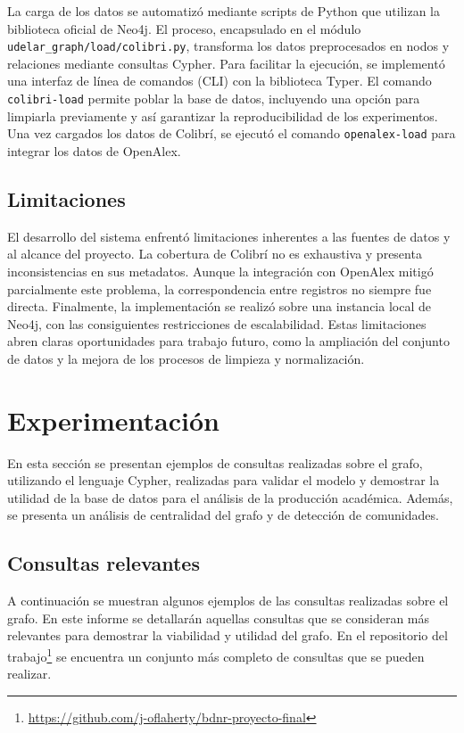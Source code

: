 \documentclass[journal]{IEEEtran}
\begin{document}
La carga de los datos se automatizó mediante scripts de Python que utilizan la biblioteca oficial de Neo4j. El proceso, encapsulado en el módulo \texttt{udelar\_graph/load/colibri.py}, transforma los datos preprocesados en nodos y relaciones mediante consultas Cypher. Para facilitar la ejecución, se implementó una interfaz de línea de comandos (CLI) con la biblioteca Typer. El comando \texttt{colibri-load} permite poblar la base de datos, incluyendo una opción para limpiarla previamente y así garantizar la reproducibilidad de los experimentos. Una vez cargados los datos de Colibrí, se ejecutó el comando \texttt{openalex-load} para integrar los datos de OpenAlex.

\subsection{Limitaciones}
El desarrollo del sistema enfrentó limitaciones inherentes a las fuentes de datos y al alcance del proyecto. La cobertura de Colibrí no es exhaustiva y presenta inconsistencias en sus metadatos. Aunque la integración con OpenAlex mitigó parcialmente este problema, la correspondencia entre registros no siempre fue directa. Finalmente, la implementación se realizó sobre una instancia local de Neo4j, con las consiguientes restricciones de escalabilidad. Estas limitaciones abren claras oportunidades para trabajo futuro, como la ampliación del conjunto de datos y la mejora de los procesos de limpieza y normalización.

\section{Experimentación}
\label{expe}
En esta sección se presentan ejemplos de consultas realizadas sobre el grafo, utilizando el lenguaje Cypher, realizadas para validar el modelo y demostrar la utilidad de la base de datos para el análisis de la producción académica. Además, se presenta un análisis de centralidad del grafo y de detección de comunidades.

\subsection{Consultas relevantes}
A continuación se muestran algunos ejemplos de las consultas realizadas sobre el grafo. En este informe se detallarán aquellas consultas que se consideran más relevantes para demostrar la viabilidad y utilidad del grafo. En el repositorio del trabajo\footnote{\url{https://github.com/j-oflaherty/bdnr-proyecto-final}} se encuentra un conjunto más completo de consultas que se pueden realizar.
\end{document}
